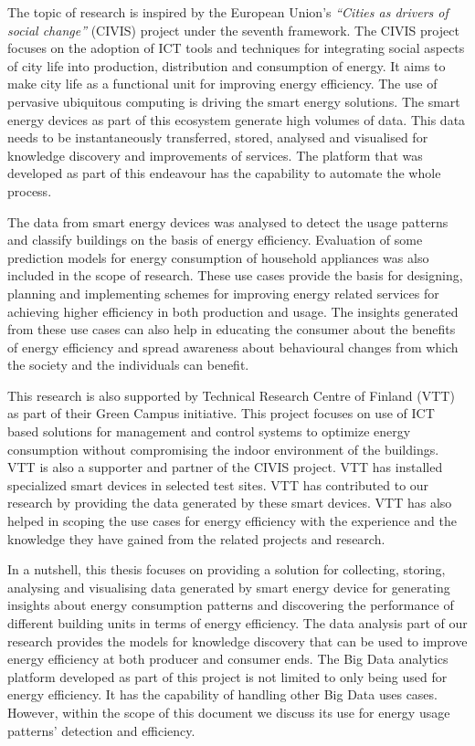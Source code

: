The topic of research is inspired by the European Union's \emph{``Cities as drivers of social change''} (CIVIS) project under the seventh framework. The CIVIS project focuses on the adoption of ICT tools and techniques for integrating social aspects of city life into production, distribution and consumption of energy. It aims to make city life as a functional unit for improving energy efficiency. The use of pervasive ubiquitous computing is driving the smart energy solutions. The smart energy devices as part of this ecosystem generate high volumes of data. This data needs to be instantaneously transferred, stored, analysed and visualised for knowledge discovery and  improvements of services. The platform that was developed as part of this endeavour has the capability to automate the whole process.
 
The data from smart energy devices was analysed to detect the usage patterns and classify buildings on the basis of energy efficiency. Evaluation of some prediction models for energy consumption of household appliances was also included in the scope of research. These use cases provide the basis for designing, planning and implementing schemes for improving energy related services for  achieving higher efficiency in both production and usage. The insights generated from these use cases can also help in educating the consumer about the benefits of energy efficiency and spread awareness about behavioural changes from which the society and the individuals can benefit. 

This research is also supported by Technical Research Centre of Finland (VTT) as part of their Green Campus initiative. This project focuses on use of ICT based solutions for management and control systems to optimize energy consumption without compromising the indoor environment of the buildings. VTT is also a supporter and partner of the CIVIS project. VTT has installed specialized smart devices in selected test sites. VTT has contributed to our research by providing the data generated by these smart devices. VTT has also helped in scoping the use cases for energy efficiency with the experience and the knowledge they have gained from the related projects and research.

In a nutshell, this thesis focuses on providing a solution for collecting, storing, analysing and visualising data generated by smart energy device for generating insights about energy consumption patterns and discovering the performance of different building units in terms of energy efficiency. The data analysis part of our research provides the models for knowledge discovery that can be used to improve energy efficiency at both producer and consumer ends. The Big Data analytics platform developed as part of this project is not limited to only being used for energy efficiency. It has the capability of handling other Big Data uses cases. However, within the scope of this document we discuss its use for energy usage patterns' detection and efficiency.     





